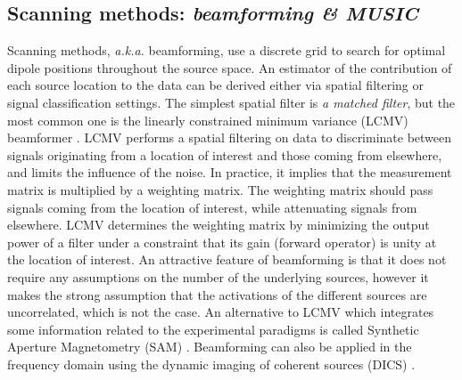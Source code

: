 \subsection{Scanning methods: \textit{beamforming \& MUSIC}}
Scanning methods, \textit{a.k.a.} beamforming, use a discrete grid to search for optimal dipole positions throughout the source space. An estimator of the contribution of each source location to the data can be derived either via spatial filtering or signal classification settings. The simplest spatial filter is \textit{a matched filter}, but the most common one is the linearly constrained minimum variance (LCMV) beamformer \cite{van1997localization}.
LCMV performs a spatial filtering on data to discriminate between signals originating from a location of interest and those coming from elsewhere, and limits the influence of the noise. In practice, it implies that the measurement matrix is multiplied by a weighting matrix. The weighting matrix should pass signals coming from the location of interest, while attenuating signals from elsewhere. LCMV determines the weighting matrix by minimizing the output power of a filter under a constraint that its gain (forward operator) is unity at the location of interest. An attractive feature of beamforming is that it does not require any assumptions on the number of the underlying sources, however it makes the strong assumption that the activations of the different sources are uncorrelated, which is not the case. An alternative to LCMV which integrates some information related to the experimental paradigms is called Synthetic Aperture Magnetometry (SAM) \cite{vrba2001signal}. Beamforming can also be applied in the frequency domain using the dynamic imaging of coherent sources (DICS) \cite{gross2001dynamic}.

